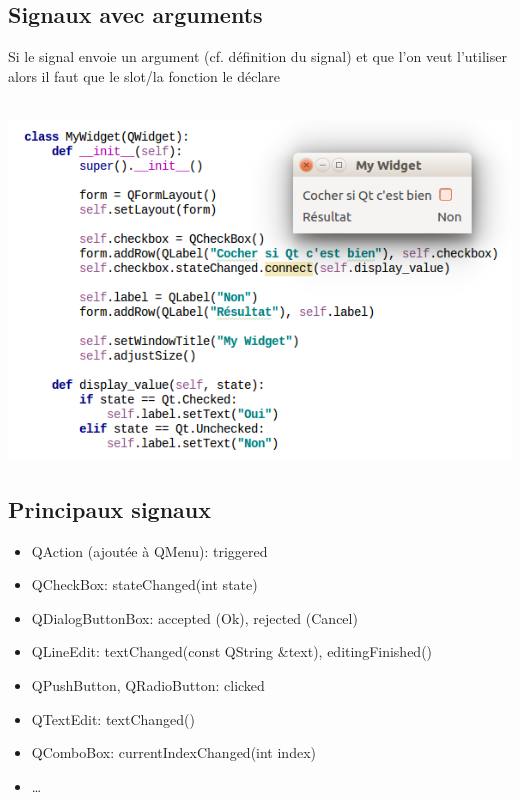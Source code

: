 \documentclass[9pt, french, brown]{beamer}
\newcommand{\mytitle}[1]{{\color{brown}#1 \\~\\}}
\begin{document}
\subsection{Signaux avec arguments}

\begin{frame}[fragile]{\secname}{\subsecname}
\mytitle{Si le signal envoie un argument (cf. définition du signal) et que l\rq{}on veut l\rq{}utiliser alors il faut que le slot/la fonction le déclare}
\begin{center}\includegraphics[scale=0.4]{img/signals2_1}\end{center}
\end{frame}

\subsection{Principaux signaux}

\begin{frame}{\secname}{\subsecname}
\begin{itemize}
\item QAction (ajoutée à QMenu): triggered
\item QCheckBox: stateChanged(int state)
\item QDialogButtonBox: accepted (Ok), rejected (Cancel)
\item QLineEdit: textChanged(const QString \&text), editingFinished()
\item QPushButton, QRadioButton: clicked
\item QTextEdit: textChanged()
\item QComboBox: currentIndexChanged(int index)
\item \ldots
\end{itemize}
\end{frame}
\end{document}

